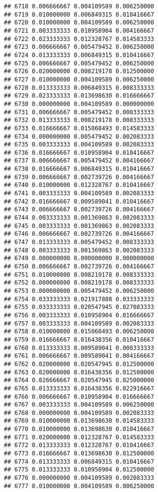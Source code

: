 \documentclass[
]{article}
\begin{document}
\begin{verbatim}
## 6718 0.006666667 0.004109589 0.006250000
## 6719 0.010000000 0.006849315 0.010416667
## 6720 0.010000000 0.004109589 0.006250000
## 6721 0.003333333 0.010958904 0.004166667
## 6722 0.023333333 0.012328767 0.014583333
## 6723 0.006666667 0.005479452 0.006250000
## 6724 0.013333333 0.006849315 0.010416667
## 6725 0.006666667 0.005479452 0.006250000
## 6726 0.020000000 0.008219178 0.012500000
## 6727 0.010000000 0.004109589 0.006250000
## 6728 0.013333333 0.006849315 0.008333333
## 6729 0.023333333 0.013698630 0.016666667
## 6730 0.000000000 0.004109589 0.000000000
## 6731 0.006666667 0.005479452 0.008333333
## 6732 0.013333333 0.008219178 0.008333333
## 6733 0.016666667 0.015068493 0.014583333
## 6734 0.000000000 0.005479452 0.002083333
## 6735 0.003333333 0.004109589 0.002083333
## 6736 0.016666667 0.010958904 0.010416667
## 6737 0.006666667 0.005479452 0.004166667
## 6738 0.016666667 0.006849315 0.010416667
## 6739 0.006666667 0.002739726 0.004166667
## 6740 0.010000000 0.012328767 0.010416667
## 6741 0.003333333 0.004109589 0.002083333
## 6742 0.016666667 0.009589041 0.010416667
## 6743 0.006666667 0.002739726 0.004166667
## 6744 0.003333333 0.001369863 0.002083333
## 6745 0.003333333 0.001369863 0.002083333
## 6746 0.006666667 0.002739726 0.004166667
## 6747 0.013333333 0.005479452 0.008333333
## 6748 0.003333333 0.001369863 0.002083333
## 6749 0.000000000 0.000000000 0.000000000
## 6750 0.006666667 0.002739726 0.004166667
## 6751 0.010000000 0.008219178 0.008333333
## 6752 0.000000000 0.008219178 0.008333333
## 6753 0.000000000 0.005479452 0.006250000
## 6754 0.033333333 0.021917808 0.033333333
## 6755 0.033333333 0.020547945 0.027083333
## 6756 0.003333333 0.010958904 0.016666667
## 6757 0.003333333 0.004109589 0.002083333
## 6758 0.010000000 0.015068493 0.006250000
## 6759 0.016666667 0.016438356 0.010416667
## 6760 0.013333333 0.009589041 0.008333333
## 6761 0.006666667 0.009589041 0.004166667
## 6762 0.020000000 0.020547945 0.012500000
## 6763 0.020000000 0.016438356 0.012500000
## 6764 0.026666667 0.020547945 0.025000000
## 6765 0.013333333 0.016438356 0.022916667
## 6766 0.006666667 0.010958904 0.016666667
## 6767 0.003333333 0.004109589 0.006250000
## 6768 0.000000000 0.004109589 0.002083333
## 6769 0.010000000 0.013698630 0.014583333
## 6770 0.010000000 0.013698630 0.010416667
## 6771 0.020000000 0.012328767 0.014583333
## 6772 0.013333333 0.012328767 0.010416667
## 6773 0.016666667 0.013698630 0.012500000
## 6774 0.013333333 0.006849315 0.010416667
## 6775 0.013333333 0.010958904 0.012500000
## 6776 0.000000000 0.004109589 0.002083333
## 6777 0.010000000 0.004109589 0.006250000

\end{verbatim}
\end{document}
